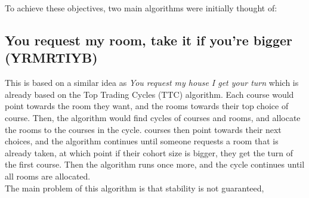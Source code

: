 \documentclass[a4paper, oneside]{article}
\begin{document}
To achieve these objectives, two main algorithms were initially thought of:
\subsection{You request my room, take it if you're bigger (YRMRTIYB)}
This is based on a similar idea as \textit{You request my house I get your turn} which is already based on the Top Trading Cycles (TTC) algorithm.
Each course would point towards the room they want, and the rooms towards their top choice of course. Then, the algorithm would find cycles of courses and rooms, and allocate the rooms to the courses in the cycle.
courses then point towards their next choices, and the algorithm continues until someone requests a room that is already taken, at which point if their cohort size is bigger, they get the turn of the first course. 
Then the algorithm runs once more, and the cycle continues until all rooms are allocated.\\

The main problem of this algorithm is that stability is not guaranteed,
\end{document}
